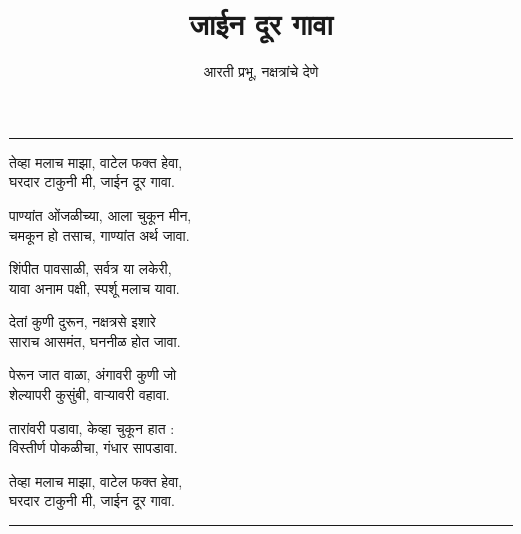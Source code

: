 \documentclass[17pt]{extarticle}  %
\begin{document}
\title{जाईन दूर गावा}
\author{आरती प्रभू, नक्षत्रांचे देणे}
\date{}
\maketitle
\hrule
\vspace{5mm}



तेव्हा मलाच माझा, वाटेल फक्त हेवा,\\
घरदार टाकुनी मी, जाईन दूर गावा.  

पाण्यांत ओंजळीच्या, आला चुकून मीन, \\
चमकून हो तसाच, गाण्यांत अर्थ जावा. 

शिंपीत पावसाळी, सर्वत्र या लकेरी,\\
यावा अनाम पक्षी, स्पर्शू मलाच यावा. 

देतां कुणी दुरून, नक्षत्रसे इशारे\\
साराच आसमंत, घननीळ होत जावा. 

पेरून जात वाळा, अंगावरी कुणी जो\\
शेल्यापरी कुसुंबी, वाऱ्यावरी वहावा. 

तारांवरी पडावा, केव्हा चुकून हात :\\
विस्तीर्ण पोकळीचा, गंधार सापडावा.  

तेव्हा मलाच माझा, वाटेल फक्त हेवा,\\
घरदार टाकुनी मी, जाईन दूर गावा.  

\vspace{5mm}
\hrule
\end{document}

